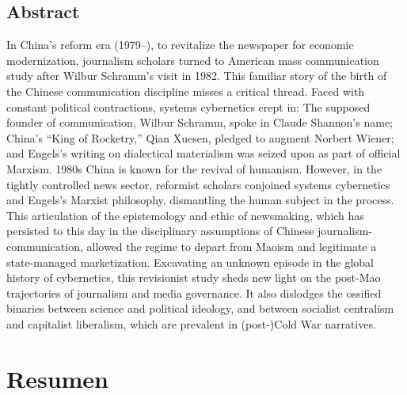 \documentclass{tufte-handout}
\begin{document}
\begin{titlepage}
\vspace*{1em}

\hypertarget{abstract}{%
\section{Abstract}\label{abstract}}


In China's reform era (1979--), to revitalize the newspaper for economic
modernization, journalism scholars turned to American mass communication
study after Wilbur Schramm's visit in 1982. This familiar story of the
birth of the Chinese communication discipline misses a critical thread.
Faced with constant political contractions, systems cybernetics crept
in: The supposed founder of communication, Wilbur Schramm, spoke in
Claude Shannon's name; China's ``King of Rocketry,'' Qian Xuesen,
pledged to augment Norbert Wiener; and Engels's writing on dialectical
materialism was seized upon as part of official Marxism. 1980s China is
known for the revival of humanism. However, in the tightly controlled
news sector, reformist scholars conjoined systems cybernetics and
Engels's Marxist philosophy, dismantling the human subject in the
process. This articulation of the epistemology and ethic of newsmaking,
which has persisted to this day in the disciplinary assumptions of
Chinese journalism-communication, allowed the regime to depart from
Maoism and legitimate a state-managed marketization. Excavating an
unknown episode in the global history of cybernetics, this revisionist
study sheds new light on the post-Mao trajectories of journalism and
media governance. It also dislodges the ossified binaries between
science and political ideology, and between socialist centralism and
capitalist liberalism, which are prevalent in (post-)Cold War
narratives.





\enlargethispage{2\baselineskip}

\vspace*{2em}



\end{titlepage}

\hypertarget{resumen}{%
\section{Resumen}\label{resumen}}
\end{document}
